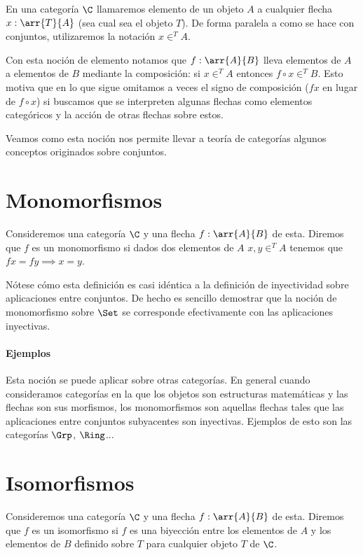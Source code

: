\begin{definition}
En una categoría $\C$ llamaremos elemento de un objeto $A$
a cualquier flecha $x : \arr{T}{A}$ (sea cual sea el objeto
$T$). De forma paralela a como se hace con conjuntos, utilizaremos
la notación $x \in^T A$.
\end{definition}

Con esta noción de elemento notamos que $f : \arr{A}{B}$ lleva
elementos de $A$ a elementos de $B$ mediante la composición: si
$x \in^T A$ entonces $f \circ x \in^T B$. Esto motiva que en lo que
sigue omitamos a veces el signo de composición ($f x$ en lugar
de $f \circ x$) si buscamos que se interpreten algunas flechas
como elementos categóricos y la acción de otras flechas sobre estos.

Veamos como esta noción nos permite llevar a teoría de categorías
algunos conceptos originados sobre conjuntos.

\section{Monomorfismos}
\begin{definition}
Consideremos una categoría $\C$ y una flecha $f : \arr{A}{B}$ de esta.
Diremos que $f$ es un monomorfismo si dados dos elementos de $A$
$x, y \in^T A$ tenemos que $fx = fy \implies x = y$.
\end{definition}

Nótese cómo esta definición es casi idéntica a la definición de
inyectividad sobre aplicaciones entre conjuntos. De hecho es sencillo
demostrar que la noción de monomorfismo sobre $\Set$ se corresponde
efectivamente con las aplicaciones inyectivas.


\paragraph{Ejemplos}
Esta noción se puede aplicar sobre otras categorías. En general
cuando consideramos categorías en la que los objetos son estructuras
matemáticas y las flechas son sus morfismos, los monomorfismos son
aquellas flechas tales que las aplicaciones entre conjuntos subyacentes
son inyectivas. Ejemplos de esto son las categorías
$\Grp$, $\Ring$...

\section{Isomorfismos}
\begin{definition}
Consideremos una categoría $\C$ y una flecha $f : \arr{A}{B}$ de
esta. Diremos que $f$ es un isomorfismo si $f$ es una biyección
entre los elementos de $A$ y los elementos de $B$ definido sobre
$T$ para cualquier objeto $T$ de $\C$.
\end{definition}

